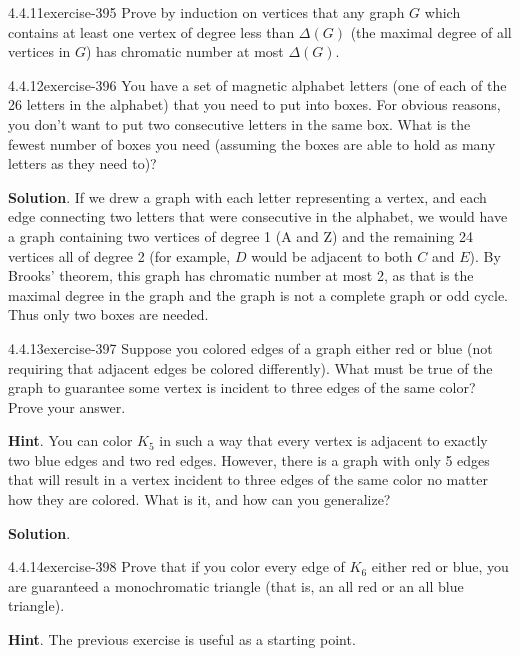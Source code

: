 \documentclass[twoside,11pt,]{book}
\numberwithin{equation}{chapter}
\begin{document}
\begin{divisionsolution}{4.4.11}{}{exercise-395}%
\hypertarget{p-4803}{}%
Prove by induction on vertices that any graph \(G\) which contains at least one vertex of degree less than \(\Delta(G)\) (the maximal degree of all vertices in \(G\)) has chromatic number at most \(\Delta(G)\).%
\end{divisionsolution}%
\begin{divisionsolution}{4.4.12}{}{exercise-396}%
\hypertarget{p-4804}{}%
You have a set of magnetic alphabet letters (one of each of the 26 letters in the alphabet) that you need to put into boxes. For obvious reasons, you don't want to put two consecutive letters in the same box. What is the fewest number of boxes you need (assuming the boxes are able to hold as many letters as they need to)?%
\par\smallskip%
\noindent\textbf{Solution}.\quad%
\hypertarget{p-4805}{}%
If we drew a graph with each letter representing a vertex, and each edge connecting two letters that were consecutive in the alphabet, we would have a graph containing two vertices of degree 1 (A and Z) and the remaining 24 vertices all of degree 2 (for example, \(D\) would be adjacent to both \(C\) and \(E\)). By Brooks' theorem, this graph has chromatic number at most 2, as that is the maximal degree in the graph and the graph is not a complete graph or odd cycle. Thus only two boxes are needed.%
\end{divisionsolution}%
\begin{divisionsolution}{4.4.13}{}{exercise-397}%
\hypertarget{p-4806}{}%
Suppose you colored edges of a graph either red or blue (not requiring that adjacent edges be colored differently).  What must be true of the graph to guarantee some vertex is incident to three edges of the same color?  Prove your answer.%
\par\smallskip%
\noindent\textbf{Hint}.\quad%
\hypertarget{p-4807}{}%
You can color \(K_5\) in such a way that every vertex is adjacent to exactly two blue edges and two red edges.  However, there is a graph with only 5 edges that will result in a vertex incident to three edges of the same color no matter how they are colored.  What is it, and how can you generalize?%
\par\smallskip%
\noindent\textbf{Solution}.\quad%
\hypertarget{p-4808}{}%
%
\end{divisionsolution}%
\begin{divisionsolution}{4.4.14}{}{exercise-398}%
\hypertarget{p-4809}{}%
Prove that if you color every edge of \(K_6\) either red or blue, you are guaranteed a monochromatic triangle (that is, an all red or an all blue triangle).%
\par\smallskip%
\noindent\textbf{Hint}.\quad%
\hypertarget{p-4810}{}%
The previous exercise is useful as a starting point.%
\end{divisionsolution}%
\end{document}
